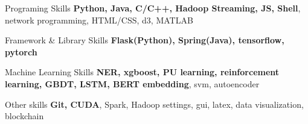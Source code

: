 
\begin{cvskills}
  \cvskill
    {Programing Skills} %
    {\textbf{Python, Java, C/C++, Hadoop Streaming, JS, Shell}, network programming, HTML/CSS, d3, MATLAB} %

  \cvskill
    {Framework \& Library Skills}
    {\textbf{Flask(Python), Spring(Java), tensorflow, pytorch}}

  \cvskill
    {Machine Learning Skills} %
    {\textbf{NER, xgboost, PU learning, reinforcement learning, GBDT, LSTM, BERT embedding}, svm, autoencoder} %

  \cvskill
    {Other skills}
    {\textbf{Git, CUDA}, Spark, Hadoop settings, gui, latex, data visualization, blockchain}
\end{cvskills}
